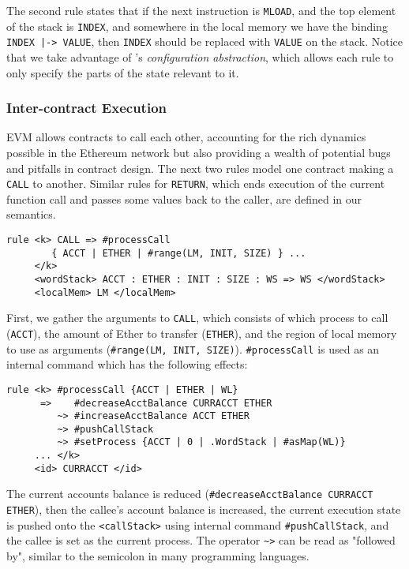 The second rule states that if the next instruction is \texttt{MLOAD}, and the
top element of the stack is \texttt{INDEX}, and somewhere in the local memory we
have the binding \texttt{INDEX |-> VALUE}, then \texttt{INDEX} should be
replaced with \texttt{VALUE} on the stack. Notice that we take advantage of \K{}'s
\textit{configuration abstraction}, which allows each rule to only specify the
parts of the state relevant to it.

\subsubsection{Inter-contract Execution}

EVM allows contracts to call each other, accounting for the rich dynamics
possible in the Ethereum network but also providing a wealth of potential bugs
and pitfalls in contract design. The next two rules model one contract making a
\texttt{CALL} to another. Similar rules for \texttt{RETURN}, which ends
execution of the current function call and passes some values back to the
caller, are defined in our semantics.

\begin{verbatim}
rule <k> CALL => #processCall
        { ACCT | ETHER | #range(LM, INIT, SIZE) } ...
     </k>
     <wordStack> ACCT : ETHER : INIT : SIZE : WS => WS </wordStack>
     <localMem> LM </localMem>
\end{verbatim}

First, we gather the arguments to \texttt{CALL}, which consists of which process
to call (\texttt{ACCT}), the amount of Ether to transfer (\texttt{ETHER}), and
the region of local memory to use as arguments (\texttt{\#range(LM, INIT,
SIZE)}). \texttt{\#processCall} is used as an internal command which has the
following effects:

\begin{verbatim}
rule <k> #processCall {ACCT | ETHER | WL}
      =>    #decreaseAcctBalance CURRACCT ETHER
         ~> #increaseAcctBalance ACCT ETHER
         ~> #pushCallStack
         ~> #setProcess {ACCT | 0 | .WordStack | #asMap(WL)}
     ... </k>
     <id> CURRACCT </id>
\end{verbatim}

The current accounts balance is reduced (\texttt{\#decreaseAcctBalance CURRACCT
ETHER}), then the callee's account balance is increased, the current execution
state is pushed onto the \texttt{<callStack>} using internal command
\texttt{\#pushCallStack}, and the callee is set as the current process. The
operator \texttt{\textasciitilde >} can be read as "followed by", similar to the semicolon in many programming languages.
